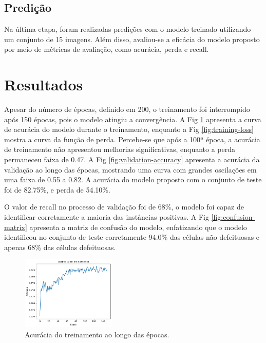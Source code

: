 \documentclass[conference]{IEEEtran}
\begin{document}
\subsection{Predição}\label{AA}

Na última etapa, foram realizadas predições com o modelo treinado utilizando
um conjunto de 15 imagens. Além disso, avaliou-se a eficácia do modelo proposto
por meio de métricas de avaliação, como acurácia, perda e recall.

\section{Resultados}

Apesar do número de épocas, definido em 200, o treinamento foi interrompido
após 150 épocas, pois o modelo atingiu a convergência. A Fig
\ref{fig:training-accuracy} apresenta a curva de acurácia
do modelo durante o treinamento, enquanto a Fig \ref{fig:training-loss}
mostra a curva da função de perda. Percebe-se que após a 100ª época, a acurácia
de treinamento não apresentou melhorias significativas, enquanto a perda
permaneceu faixa de 0.47. A Fig \ref{fig:validation-accuracy} apresenta a
acurácia da validação ao longo das épocas, mostrando uma curva com grandes
oscilações em uma faixa de 0.55 a 0.82. A acurácia do modelo proposto com o
conjunto de teste foi de 82.75\%, e perda de 54.10\%.

O valor de recall no processo de validação foi de 68\%, o modelo foi capaz
de identificar corretamente a maioria das instâncias positivas. A Fig
\ref{fig:confusion-matrix} apresenta a matriz de confusão do modelo,
enfatizando que o modelo identificou no conjunto de teste corretamente 94.0\%
das células não defeituosas e apenas 68\% das células defeituosas.

\begin{figure}[htbp]

    \centerline{\includegraphics[width=0.4\textwidth]{images/training-accuracy.png}}
    \caption{Acurácia do treinamento ao longo das épocas.}
    \label{fig:training-accuracy}
\end{figure}
\end{document}
